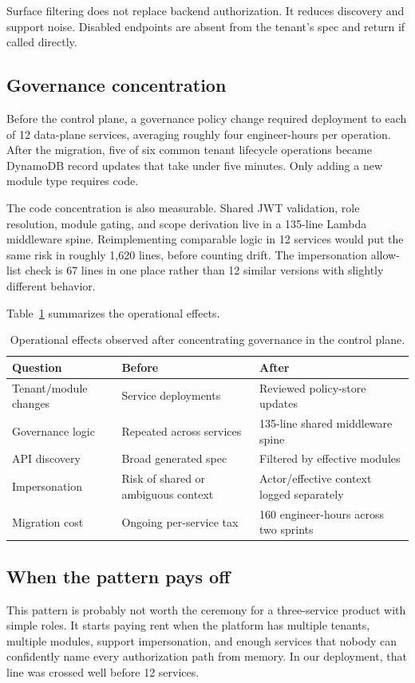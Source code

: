 Surface filtering does not replace backend authorization. It reduces discovery and support noise. Disabled endpoints are absent from the tenant's spec and return  if called directly.

\subsection{Governance concentration}

Before the control plane, a governance policy change required deployment to each of 12 data-plane services, averaging roughly four engineer-hours per operation. After the migration, five of six common tenant lifecycle operations became DynamoDB record updates that take under five minutes. Only adding a new module type requires code.

The code concentration is also measurable. Shared JWT validation, role resolution, module gating, and scope derivation live in a 135-line Lambda middleware spine. Reimplementing comparable logic in 12 services would put the same risk in roughly 1,620 lines, before counting drift. The impersonation allow-list check is 67 lines in one place rather than 12 similar versions with slightly different behavior.

Table~\ref{tab:operations} summarizes the operational effects.

\begin{table}[H]
  \centering
  \small
  \begin{tabularx}{\textwidth}{X X X}
    \toprule
    \textbf{Question} & \textbf{Before} & \textbf{After} \\
    \midrule
    Tenant/module changes & Service deployments & Reviewed policy-store updates \\
    Governance logic & Repeated across services & 135-line shared middleware spine \\
    API discovery & Broad generated spec & Filtered by effective modules \\
    Impersonation & Risk of shared or ambiguous context & Actor/effective context logged separately \\
    Migration cost & Ongoing per-service tax & 160 engineer-hours across two sprints \\
    \bottomrule
  \end{tabularx}
  \caption{Operational effects observed after concentrating governance in the control plane.}
  \label{tab:operations}
\end{table}

\subsection{When the pattern pays off}

This pattern is probably not worth the ceremony for a three-service product with simple roles. It starts paying rent when the platform has multiple tenants, multiple modules, support impersonation, and enough services that nobody can confidently name every authorization path from memory. In our deployment, that line was crossed well before 12 services.
